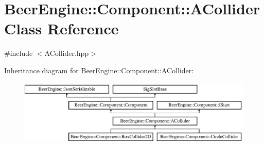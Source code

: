\hypertarget{class_beer_engine_1_1_component_1_1_a_collider}{}\section{Beer\+Engine\+:\+:Component\+:\+:A\+Collider Class Reference}
\label{class_beer_engine_1_1_component_1_1_a_collider}


{\ttfamily \#include $<$A\+Collider.\+hpp$>$}

Inheritance diagram for Beer\+Engine\+:\+:Component\+:\+:A\+Collider\+:\begin{figure}[H]
\begin{center}
\leavevmode
\includegraphics[height=3.085400cm]{class_beer_engine_1_1_component_1_1_a_collider}
\end{center}
\end{figure}
